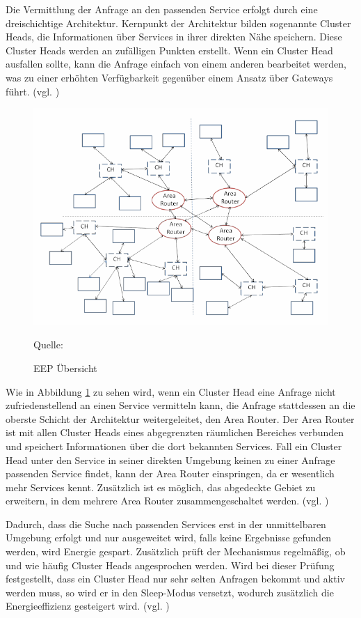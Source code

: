 \documentclass[conference,compsoc]{IEEEtran}
\begin{document}
Die Vermittlung der Anfrage an den passenden Service erfolgt durch eine dreischichtige Architektur. Kernpunkt der Architektur bilden sogenannte Cluster Heads, die Informationen über Services in ihrer direkten Nähe speichern. Diese Cluster Heads werden an zufälligen Punkten erstellt. Wenn ein Cluster Head ausfallen sollte, kann die Anfrage einfach von einem anderen bearbeitet werden, was zu einer erhöhten Verfügbarkeit gegenüber einem Ansatz über Gateways führt. (vgl. \cite{energy-efficient})

\begin{figure}[h]
\centering
\includegraphics[scale=0.45]{EEP.png}
\caption{EEP Übersicht}
\label{EEPBild}
Quelle: \cite{energy-efficient}
\end{figure}

Wie in Abbildung \ref{EEPBild} zu sehen wird, wenn ein Cluster Head eine Anfrage nicht zufriedenstellend an einen Service vermitteln kann, die Anfrage stattdessen an die oberste Schicht der Architektur weitergeleitet, den Area Router. Der Area Router ist mit allen Cluster Heads eines abgegrenzten räumlichen Bereiches verbunden und speichert Informationen über die dort bekannten Services. Fall ein Cluster Head unter den Service in seiner direkten Umgebung keinen zu einer Anfrage passenden Service findet, kann der Area Router einspringen, da er wesentlich mehr Services kennt. Zusätzlich ist es möglich, das abgedeckte Gebiet zu erweitern, in dem mehrere Area Router zusammengeschaltet werden. (vgl. \cite{energy-efficient})

Dadurch, dass die Suche nach passenden Services erst in der unmittelbaren Umgebung erfolgt und nur ausgeweitet wird, falls keine Ergebnisse gefunden werden, wird Energie gespart. Zusätzlich prüft der Mechanismus regelmäßig, ob und wie häufig Cluster Heads angesprochen werden. Wird bei dieser Prüfung festgestellt, dass ein Cluster Head nur sehr selten Anfragen bekommt und aktiv werden muss, so wird er in den Sleep-Modus versetzt, wodurch zusätzlich die Energieeffizienz gesteigert wird. (vgl. \cite{energy-efficient})
\end{document}
